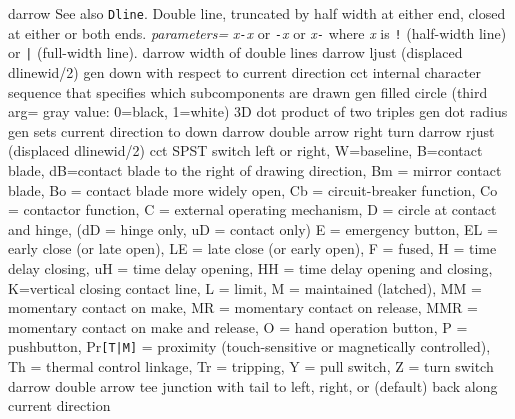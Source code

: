   {darrow}
  {See also {\tt Dline}.
   Double line, truncated by half width at either end, closed
    at either or both ends.
   {\sl parameters=}
      {\sl x}{\tt -}{\sl x} or
      {\tt -}{\sl x} or
      {\sl x}{\tt -} where {\sl x} is {\tt !} (half-width line)
       or {\tt |} (full-width line).}
  {darrow}
  {width of double lines}
  {darrow}
  {ljust (displaced dlinewid/2)}
  {gen}
  {down with respect to current direction}
  {cct}
  {internal character sequence that specifies which subcomponents are drawn}
  {gen}
  {filled circle (third arg= gray value: 0=black, 1=white)}
  {3D}
  {dot product of two triples}
  {gen}
  {dot radius}
  {gen}
  {sets current direction to down }
  {darrow}
  {double arrow right turn}
  {darrow}
  {rjust (displaced dlinewid/2)}
  {cct}
  {SPST switch left or right, W=baseline, B=contact blade,
    dB=contact blade to the right of drawing direction,
         Bm = mirror contact blade,
         Bo = contact blade more widely open,
         Cb = circuit-breaker function,
         Co = contactor function,
         C = external operating mechanism,
         D = circle at contact and hinge,
             (dD = hinge only, uD = contact only)
         E = emergency button,
         EL = early close (or late open),
         LE = late close (or early open),
         F = fused,
         H = time delay closing,
         uH = time delay opening,
         HH = time delay opening and closing,
         K=vertical closing contact line,
         L = limit,
         M = maintained (latched),
         MM = momentary contact on make,
         MR = momentary contact on release,
         MMR = momentary contact on make and release,
         O = hand operation button,
         P = pushbutton,
         Pr{\tt [T|M]} = proximity (touch-sensitive or magnetically controlled),
         Th = thermal control linkage,
         Tr = tripping,
         Y = pull switch,
         Z = turn switch
   }
  {darrow}
  {double arrow tee junction with tail to left,
   right, or (default) back along current direction }
